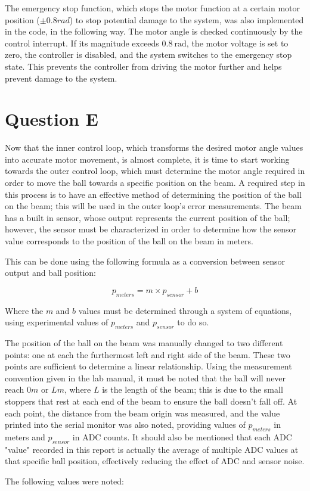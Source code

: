 \documentclass[11pt, letterpaper]{article}
\begin{document}
The emergency stop function, which stops the motor function at a certain motor position ($\pm 0.8 rad$)
to stop potential damage to the system, was also implemented in the code, in the following way.
The motor angle is checked continuously by the control interrupt. If its magnitude exceeds
$0.8\ \mathrm{rad}$, the motor voltage is set to zero, the controller is disabled, and the
system switches to the emergency stop state. This prevents the controller from driving the
motor further and helps prevent damage to the system.

\clearpage
\section{Question E}

Now that the inner control loop, which transforms the desired motor angle values into accurate
motor movement, is almost complete, it is time to start working towards the outer control loop,
which must determine the motor angle required in order to move the ball towards a specific
position on the beam. A required step in this process is to have an effective method
of determining the position of the ball on the beam; this will be used in the outer
loop's error measurements. The beam has a built in sensor, whose output represents the current
position of the ball; however, the sensor must be characterized in order to determine
how the sensor value corresponds to the position of the ball on the beam in meters. \par

This can be done using the following formula as a conversion between sensor output and
ball position:

\begin{equation}
    \label{eq:beam-sensor-linearization}
    p_{meters} = m \times p_{sensor} + b
\end{equation}

Where the $m$ and $b$ values must be determined through a system of equations, using
experimental values of $p_{meters}$ and $p_{sensor}$ to do so. \par

The position of the ball on the beam was manually changed to two different points:
one at each the furthermost left and right side of the beam. These two points are
sufficient to determine a linear relationship. Using the measurement convention
given in the lab manual, it must be noted that the ball will never reach $0m$ or $L m$,
where $L$ is the length of the beam; this is due to the small stoppers that rest at each
end of the beam to ensure the ball doesn't fall off.  At each point,
the distance from the beam origin was measured, and the value printed into the serial monitor
was also noted, providing values of $p_{meters}$ in meters and $p_{sensor}$ in ADC counts. It
should also be mentioned that each ADC "value" recorded in this report is actually the
average of multiple ADC values at that specific ball position, effectively reducing the effect of
ADC and sensor noise.\par
The following values were noted:
\end{document}

